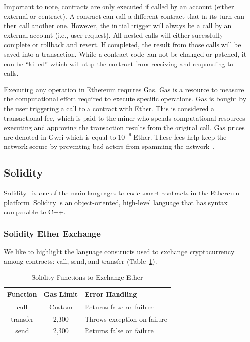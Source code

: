 \documentclass[10pt,conference]{IEEEtran}
\begin{document}
Important to note, contracts are only executed if called by an account (either external or contract). A contract can call a different contract that in its turn can then call another one. However, the initial trigger will always be a call by an external account (i.e., user request). All nested calls will either sucessfully complete or rollback and revert. If completed, the result from those calls will be saved into a transaction. While a contract code can not be changed or patched, it can be ``killed'' which will stop the contract from receiving and responding to calls.

Executing any operation in Ethereum requires Gas. Gas is a resource to measure the computational effort required to execute specific operations. Gas is bought by the user triggering a call to a contract with Ether. This is considered a transactional fee, which is paid to the miner who spends computational resources executing and approving the transaction results from the original call. Gas prices are denoted in Gwei which is equal to $10^{-9}$ Ether. These fees help keep the network secure by preventing bad actors from spamming the network~\cite{docs}.


\subsection{Solidity}

Solidity~\cite{solidity} is one of the main languages to code smart contracts in the Ethereum platform. Solidity is an object-oriented, high-level language that has syntax comparable to C++.

\subsubsection{Solidity Ether Exchange}

We like to highlight the language constructs used to exchange cryptocurrency among contracts: call, send, and transfer (Table~\ref{tab:freq}).

\begin{table}[h]
\center
  \caption{Solidity Functions to Exchange Ether}
  \label{tab:freq}
  \begin{tabular}{ccl}
    \hline
    Function & Gas Limit & Error Handling\\
    \hline
    call & Custom & Returns false on failure\\
    transfer & 2,300 & Throws exception on failure\\
    send & 2,300 & Returns false on failure\\
  \hline
\end{tabular}
\end{table}
\end{document}
